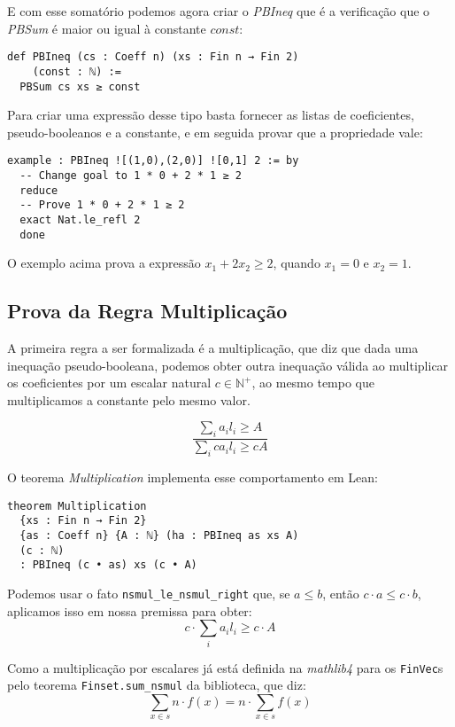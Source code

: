 \documentclass[conference]{IEEEtran}
\begin{document}
E com esse somatório podemos agora criar o \textit{PBIneq} que é a verificação que o \textit{PBSum}
é maior ou igual à constante $const$:
\begin{verbatim}
def PBIneq (cs : Coeff n) (xs : Fin n → Fin 2)
    (const : ℕ) :=
  PBSum cs xs ≥ const
\end{verbatim}

Para criar uma expressão desse tipo basta fornecer as listas de coeficientes, pseudo-booleanos e a constante,
e em seguida provar que a propriedade vale:
\\
\begin{verbatim}
example : PBIneq ![(1,0),(2,0)] ![0,1] 2 := by
  -- Change goal to 1 * 0 + 2 * 1 ≥ 2
  reduce               
  -- Prove 1 * 0 + 2 * 1 ≥ 2
  exact Nat.le_refl 2  
  done
\end{verbatim}

O exemplo acima prova a expressão $x_1 + 2 x_2 \ge 2$, quando $x_1 = 0$ e $x_2 = 1$.


\subsection{Prova da Regra Multiplicação}
A primeira regra a ser formalizada é a multiplicação, que diz que dada uma inequação pseudo-booleana, podemos obter
outra inequação válida ao multiplicar os coeficientes por um escalar natural $c \in \mathbb{N}^+ $, ao mesmo tempo que multiplicamos
a constante pelo mesmo valor.

\begin{equation}
    \frac
    {\sum_i{a_i l_i} \ge A}
    {\sum_i{c a_i l_i} \ge c A}
\end{equation}

O teorema \textit{Multiplication} implementa esse comportamento em Lean:
\begin{verbatim}
theorem Multiplication
  {xs : Fin n → Fin 2}
  {as : Coeff n} {A : ℕ} (ha : PBIneq as xs A)
  (c : ℕ)
  : PBIneq (c • as) xs (c • A)
\end{verbatim}

Podemos usar o fato \texttt{nsmul\_le\_nsmul\_right} que, se $a \le b$, então $c \cdot a \le c \cdot b$, aplicamos isso em nossa premissa para obter:
\begin{equation}
    c \cdot \sum_i{a_i l_i} \ge c \cdot A
\end{equation}

Como a multiplicação por escalares já está definida na \textit{mathlib4} para
os \texttt{FinVec}s pelo teorema \texttt{Finset.sum\_nsmul} da biblioteca,
que diz:
\begin{equation}
    \sum_{x \in s}{n \cdot f(x)} = n \cdot \sum_{x \in s}{f(x)}
\end{equation}
\end{document}
